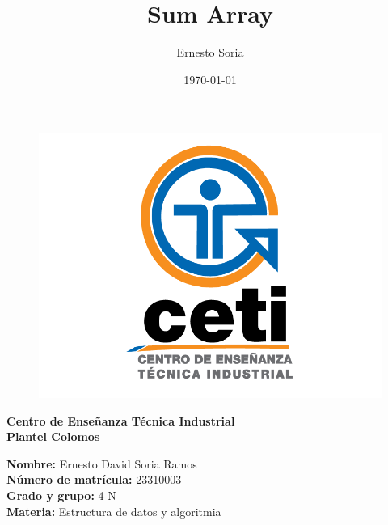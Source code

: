 \documentclass{article}
\title{\Huge \bfseries Sum Array}
\author{Ernesto Soria}
\date{\today} %
\begin{document}
	
	\maketitle %
	
	
	
	
	\begin{figure}[h] %
		\centering
		\includegraphics[width=1\textwidth]{cetilogo.png} %
		\label{fig:ceti} %
	\end{figure}
	
	\begin{center}
		{\LARGE \textbf{Centro de Enseñanza Técnica Industrial}} \\[2.5mm]
		{\LARGE \textbf{Plantel Colomos}}\\
	\end{center}
	
	\vspace{5mm} %
	
	\begin{flushleft}
		{\large \textbf{Nombre:} Ernesto David Soria Ramos} \\[2mm]
		{\large \textbf{Número de matrícula:} 23310003} \\[2mm]
		{\large \textbf{Grado y grupo:} 4-N}\\[2mm]
		{\large \textbf{Materia:} Estructura de datos y algoritmia }\\[2mm]
	\end{flushleft}
	
\end{document}
